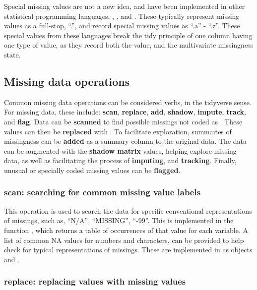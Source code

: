 \documentclass[
]{jss}
\begin{document}
Special missing values are not a new idea, and have been implemented in other statistical programming languages, , , and . These typically represent missing values as a full-stop, ``.'', and record special missing values as ``.a'' - ``.z''. These special values from these languages break the tidy principle of one column having one type of value, as they record both the value, and the multivariate missingness state.

\hypertarget{verbs}{%
\subsection{Missing data operations}\label{verbs}}

Common missing data operations can be considered verbs, in the tidyverse sense. For missing data, these include: \textbf{scan}, \textbf{replace}, \textbf{add}, \textbf{shadow}, \textbf{impute}, \textbf{track}, and \textbf{flag}. Data can be \textbf{scanned} to find possible missings not coded as . These values can then be \textbf{replaced} with . To facilitate exploration, summaries of missingness can be \textbf{added} as a summary column to the original data. The data can be augmented with the \textbf{shadow matrix} values, helping explore missing data, as well as facilitating the process of \textbf{imputing}, and \textbf{tracking}. Finally, unusual or specially coded missing values can be \textbf{flagged}.

\hypertarget{verbs-search}{%
\subsubsection{scan: searching for common missing value labels}\label{verbs-search}}

This operation is used to search the data for specific conventional representations of missings, such as, ``N/A'', ``MISSING'', ``-99''. This is implemented in the function , which returns a table of occurrences of that value for each variable. A list of common NA values for numbers and characters, can be provided to help check for typical representations of missings. These are implemented in  as objects  and .

\hypertarget{verbs-replace-with}{%
\subsubsection{replace: replacing values with missing values}\label{verbs-replace-with}}
\end{document}
